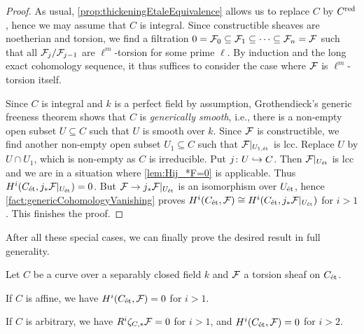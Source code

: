 \begin{proof}
	As usual, \cref{prop:thickeningEtaleEquivalence} allows us to replace $C$ by $C^{\mathrm{red}}$, hence we may assume that $C$ is integral. Since constructible sheaves are noetherian and torsion, we find a filtration $0=\mathcal{F}_0\subseteq \mathcal{F}_1\subseteq \dotsb\subseteq \mathcal{F}_n=\mathcal{F}$ such that all $\mathcal{F}_j/\mathcal{F}_{j-1}$ are $\ell^m$-torsion for some prime $\ell$. By induction and the long exact cohomology sequence, it thus suffices to consider the case where $\mathcal{F}$ is $\ell^m$-torsion itself.
	
	Since $C$ is integral and $k$ is a perfect field by assumption, Grothendieck's generic freeness theorem shows that $C$ is \emph{generically smooth}, i.e., there is a non-empty open subset $U\subseteq C$ such that $U$ is smooth over $k$. Since $\mathcal{F}$ is constructible, we find another non-empty open subset $U_1\subseteq C$ such that $\mathcal{F}|_{U_{1,\mathrm{\acute{e}t}}}$ is lcc. Replace $U$ by $U\cap U_1$, which is non-empty as $C$ is irreducible. Put $j\colon U\monomorphism C$. Then $\mathcal{F}|_{U_{\mathrm{\acute{e}t}}}$ is lcc and we are in a situation where \cref{lem:Hij_*F=0} is applicable. Thus $H^i(C_{\mathrm{\acute{e}t}},j_*\mathcal{F}|_{U_{\mathrm{\acute{e}t}}})=0$. But $\Ff\morphism j_*\Ff|_{U_\et}$ is an isomorphism over $U_{\mathrm{\acute{e}t}}$, hence \cref{fact:genericCohomologyVanishing} proves $H^i(C_{\mathrm{\acute{e}t}},\mathcal{F})\cong H^i(C_{\mathrm{\acute{e}t}},j_*\mathcal{F}|_{U_{\mathrm{\acute{e}t}}})$ for $i>1$. This finishes the proof.
\end{proof}
After all these special cases, we can finally prove the desired result in full generality.
\begin{prop}\label{prop:generalCurveVanishing}
	Let $C$ be a curve over a separably closed field $k$ and $\mathcal{F}$ a torsion sheaf on $C_{\mathrm{\acute{e}t}}$.
	\begin{alphanumerate}
		\item If $C$ is affine, we have $H^i(C_{\mathrm{\acute{e}t}},\mathcal{F})=0$ for $i>1$.
		\item If $C$ is arbitrary, we have $R^i\zeta_{C,*}\mathcal{F}=0$ for $i>1$, and $H^i(C_{\mathrm{\acute{e}t}},\mathcal{F})=0$ for $i>2$.
	\end{alphanumerate}
\end{prop}

